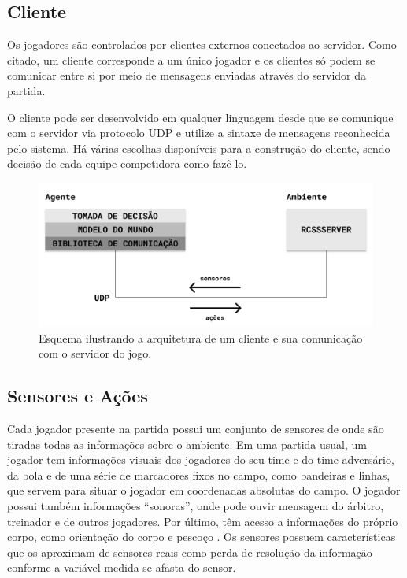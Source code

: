 \subsection{Cliente}
\par Os jogadores são controlados por clientes externos conectados ao servidor. Como citado, um cliente corresponde a um único jogador e os clientes só podem se comunicar entre si por meio de mensagens enviadas através do servidor da partida.
\par O cliente pode ser desenvolvido em qualquer linguagem desde que se comunique com o servidor via protocolo UDP e utilize a sintaxe de mensagens reconhecida pelo sistema. Há várias escolhas disponíveis para a construção do cliente, sendo decisão de cada equipe competidora como fazê-lo.

\begin{figure}[H]
	\includegraphics[width=0.9\linewidth]{figs/system.png}
	\centering
	\caption{Esquema ilustrando a arquitetura de um cliente e sua comunicação com o servidor do jogo.}
	\label{fig:system}
\end{figure}

\subsection{Sensores e Ações}
\label{sec:actions}

Cada jogador presente na partida possui um conjunto de sensores de onde são tiradas todas as informações sobre o ambiente. Em uma partida usual, um jogador tem informações visuais dos jogadores do seu time e do time adversário, da bola e de uma série de marcadores fixos no campo, como bandeiras e linhas, que servem para situar o jogador em coordenadas absolutas do campo. O jogador possui também informações ``sonoras'', onde pode ouvir mensagem do árbitro, treinador e de outros jogadores. Por último, têm acesso a informações do próprio corpo, como orientação do corpo e pescoço \cite{rcssmanual2003}. Os sensores possuem características que os aproximam de sensores reais como perda de resolução da informação conforme a variável medida se afasta do sensor.

